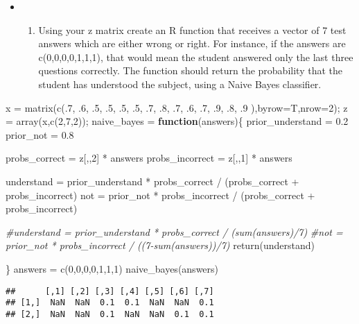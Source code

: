 \documentclass[
]{article}
\newenvironment{Shaded}{\begin{snugshade}}{\end{snugshade}}
\newcommand{\AttributeTok}[1]{\textcolor[rgb]{0.77,0.63,0.00}{#1}}
\newcommand{\CommentTok}[1]{\textcolor[rgb]{0.56,0.35,0.01}{\textit{#1}}}
\newcommand{\ControlFlowTok}[1]{\textcolor[rgb]{0.13,0.29,0.53}{\textbf{#1}}}
\newcommand{\DecValTok}[1]{\textcolor[rgb]{0.00,0.00,0.81}{#1}}
\newcommand{\FloatTok}[1]{\textcolor[rgb]{0.00,0.00,0.81}{#1}}
\newcommand{\FunctionTok}[1]{\textcolor[rgb]{0.00,0.00,0.00}{#1}}
\newcommand{\NormalTok}[1]{#1}
\newcommand{\OtherTok}[1]{\textcolor[rgb]{0.56,0.35,0.01}{#1}}
\newcommand{\SpecialCharTok}[1]{\textcolor[rgb]{0.00,0.00,0.00}{#1}}
\providecommand{\tightlist}{%
  \setlength{\itemsep}{0pt}\setlength{\parskip}{0pt}}
\begin{document}
\begin{itemize}
\item
  \begin{enumerate}
  \def\labelenumi{\alph{enumi})}
  \setcounter{enumi}{1}
  \tightlist
  \item
    Using your z matrix create an R function that receives a vector of 7
    test answers which are either wrong or right. For instance, if the
    answers are c(0,0,0,0,1,1,1), that would mean the student answered
    only the last three questions correctly. The function should return
    the probability that the student has understood the subject, using a
    Naive Bayes classifier.
  \end{enumerate}
\end{itemize}

\begin{Shaded}
\begin{Highlighting}[]
\NormalTok{x }\OtherTok{=} \FunctionTok{matrix}\NormalTok{(}\FunctionTok{c}\NormalTok{(.}\DecValTok{7}\NormalTok{, .}\DecValTok{6}\NormalTok{, .}\DecValTok{5}\NormalTok{, .}\DecValTok{5}\NormalTok{, .}\DecValTok{5}\NormalTok{, .}\DecValTok{5}\NormalTok{, .}\DecValTok{7}\NormalTok{, .}\DecValTok{8}\NormalTok{, .}\DecValTok{7}\NormalTok{, .}\DecValTok{6}\NormalTok{, .}\DecValTok{7}\NormalTok{, .}\DecValTok{9}\NormalTok{, .}\DecValTok{8}\NormalTok{, .}\DecValTok{9}\NormalTok{ ),}\AttributeTok{byrow=}\NormalTok{T,}\AttributeTok{nrow=}\DecValTok{2}\NormalTok{);}
\NormalTok{z }\OtherTok{=} \FunctionTok{array}\NormalTok{(x,}\FunctionTok{c}\NormalTok{(}\DecValTok{2}\NormalTok{,}\DecValTok{7}\NormalTok{,}\DecValTok{2}\NormalTok{));}
\NormalTok{naive\_bayes }\OtherTok{=} \ControlFlowTok{function}\NormalTok{(answers)\{}
\NormalTok{  prior\_understand }\OtherTok{=} \FloatTok{0.2}
\NormalTok{  prior\_not }\OtherTok{=} \FloatTok{0.8} 
  
\NormalTok{  probs\_correct }\OtherTok{=}\NormalTok{ z[,,}\DecValTok{2}\NormalTok{] }\SpecialCharTok{*}\NormalTok{ answers }
\NormalTok{  probs\_incorrect }\OtherTok{=}\NormalTok{ z[,,}\DecValTok{1}\NormalTok{] }\SpecialCharTok{*}\NormalTok{ answers}
  
\NormalTok{  understand }\OtherTok{=}\NormalTok{ prior\_understand }\SpecialCharTok{*}\NormalTok{ probs\_correct }\SpecialCharTok{/}\NormalTok{ (probs\_correct }\SpecialCharTok{+}\NormalTok{ probs\_incorrect)}
\NormalTok{  not }\OtherTok{=}\NormalTok{ prior\_not }\SpecialCharTok{*}\NormalTok{ probs\_incorrect }\SpecialCharTok{/}\NormalTok{ (probs\_correct }\SpecialCharTok{+}\NormalTok{ probs\_incorrect)}
  
  \CommentTok{\#understand = prior\_understand * probs\_correct / (sum(answers)/7)}
  \CommentTok{\#not = prior\_not * probs\_incorrect / ((7{-}sum(answers))/7)}
  \FunctionTok{return}\NormalTok{(understand)}
  
\NormalTok{\}}
\NormalTok{answers }\OtherTok{=} \FunctionTok{c}\NormalTok{(}\DecValTok{0}\NormalTok{,}\DecValTok{0}\NormalTok{,}\DecValTok{0}\NormalTok{,}\DecValTok{0}\NormalTok{,}\DecValTok{1}\NormalTok{,}\DecValTok{1}\NormalTok{,}\DecValTok{1}\NormalTok{)}
\FunctionTok{naive\_bayes}\NormalTok{(answers)}
\end{Highlighting}
\end{Shaded}

\begin{verbatim}
##      [,1] [,2] [,3] [,4] [,5] [,6] [,7]
## [1,]  NaN  NaN  0.1  0.1  NaN  NaN  0.1
## [2,]  NaN  NaN  0.1  NaN  NaN  0.1  0.1
\end{verbatim}
\end{document}
